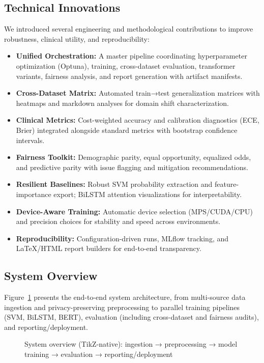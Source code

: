 \documentclass[conference]{IEEEtran}
\begin{document}
\subsection{Technical Innovations}
We introduced several engineering and methodological contributions to improve robustness, clinical utility, and reproducibility:
\begin{itemize}
    \item \textbf{Unified Orchestration:} A master pipeline coordinating hyperparameter optimization (Optuna), training, cross-dataset evaluation, transformer variants, fairness analysis, and report generation with artifact manifests.
    \item \textbf{Cross-Dataset Matrix:} Automated train→test generalization matrices with heatmaps and markdown analyses for domain shift characterization.
    \item \textbf{Clinical Metrics:} Cost-weighted accuracy and calibration diagnostics (ECE, Brier) integrated alongside standard metrics with bootstrap confidence intervals.
    \item \textbf{Fairness Toolkit:} Demographic parity, equal opportunity, equalized odds, and predictive parity with issue flagging and mitigation recommendations.
    \item \textbf{Resilient Baselines:} Robust SVM probability extraction and feature-importance export; BiLSTM attention visualizations for interpretability.
    \item \textbf{Device-Aware Training:} Automatic device selection (MPS/CUDA/CPU) and precision choices for stability and speed across environments.
    \item \textbf{Reproducibility:} Configuration-driven runs, MLflow tracking, and LaTeX/HTML report builders for end-to-end transparency.
\end{itemize}

\subsection{System Overview}

Figure~\ref{fig:system_overview} presents the end-to-end system architecture, from multi-source data ingestion and privacy-preserving preprocessing to parallel training pipelines (SVM, BiLSTM, BERT), evaluation (including cross-dataset and fairness audits), and reporting/deployment.

\begin{figure}[H]
    \centering
    \resizebox{\linewidth}{!}{\SystemOverviewDiagram}
    \caption{System overview (TikZ-native): ingestion → preprocessing → model training → evaluation → reporting/deployment}
    \label{fig:system_overview}
\end{figure}
\end{document}
